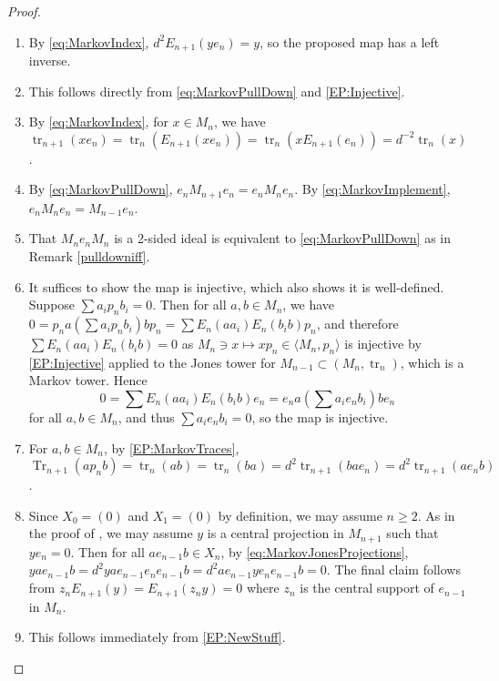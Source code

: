 \documentclass[11pt]{article}
\theoremstyle{plain}
\theoremstyle{definition}
\DeclareMathOperator{\Tr}{Tr}
\DeclareMathOperator{\tr}{tr}
\begin{document}
\begin{proof} 
\mbox{}
\begin{enumerate}[label={\rm(EP\arabic*)}]
\item
By \ref{eq:MarkovIndex}, $d^2E_{n+1}(ye_n) = y $, so the proposed map has a left inverse.

\item
This follows directly from \ref{eq:MarkovPullDown} and \ref{EP:Injective}.

\item
By \ref{eq:MarkovIndex}, for $x\in M_n$, we have $\tr_{n+1}(xe_n) = \tr_n(E_{n+1}(xe_n)) = \tr_n(x E_{n+1}(e_n)) = d^{-2} \tr_n(x)$.

\item
By \ref{eq:MarkovPullDown}, $e_n M_{n+1} e_n= e_nM_n e_n$.
By \ref{eq:MarkovImplement}, $e_n M_n e_n = M_{n-1}e_n$.

\item
That $M_ne_nM_n$ is a 2-sided ideal is equivalent to \ref{eq:MarkovPullDown} as in Remark \ref{pulldowniff}.

\item
It suffices to show the map is injective, which also shows it is well-defined. %
Suppose $\sum a_i p_n b_i = 0$.
Then for all $a,b\in M_n$, we have $0=p_na\left(\sum a_i p_n b_i\right) bp_n = \sum E_{n}(aa_i)E_n(b_ib)p_n$, and therefore $\sum E_{n}(aa_i)E_n(b_ib) = 0$ as $M_n \ni x\mapsto xp_n \in \langle M_n, p_n\rangle$ is injective by \ref{EP:Injective} applied to the Jones tower for $M_{n-1} \subset (M_n,\tr_n)$, which is a Markov tower.
Hence 
$$
0 = \sum E_{n}(aa_i)E_n(b_ib)e_n = e_na\left(\sum a_i e_n b_i\right) be_n
$$ 
for all $a,b\in M_n$, and thus $\sum a_i e_n b_i = 0$, so the map is injective. 


\item
For $a,b\in M_n$, by \ref{EP:MarkovTraces}, 
$\Tr_{n+1}(ap_n b) = \tr_n(ab) = \tr_n(ba) = d^2\tr_{n+1}(bae_n) = d^2 \tr_{n+1}(ae_n b)$.

\item
Since $X_0 = (0)$ and $X_1 = (0)$ by definition, we may assume $n\geq 2$.
As in the proof of \cite[Thm.~4.6.3.vi]{MR999799}, we may assume $y$ is a central projection in $M_{n+1}$ such that $y e_{n} = 0$.
Then for all $ae_{n-1} b \in X_n$, by \ref{eq:MarkovJonesProjections}, $y ae_{n-1} b = d^2 yae_{n-1} e_{n}e_{n-1} b = d^2 ae_{n-1} ye_{n} e_{n-1} b = 0$.
The final claim follows from $z_{n}E_{n+1}(y) = E_{n+1}(z_n y)= 0$ where $z_n$ is the central support of $e_{n-1}$ in $M_n$.

\item
This follows immediately from \ref{EP:NewStuff}.
\qedhere

\end{enumerate}
\end{proof}
\end{document}
